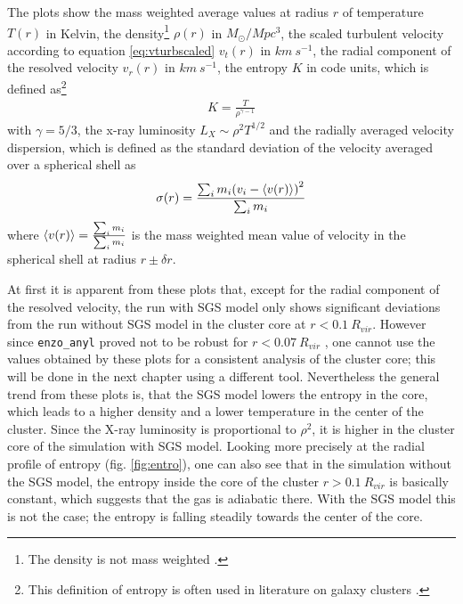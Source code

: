 The plots show the mass weighted average values at radius $r$ of temperature
$T(r)$ in Kelvin, the density\footnote{The density is not mass weighted
.} $\rho(r)$ in $\unit{M_{\odot}/Mpc^3}$, the scaled turbulent velocity
according to equation \eqref{eq:vturbscaled} $v_t(r)$ in $\unit{km\ s^{-1}}$,
the radial component of the resolved velocity $v_r(r)$ in $\unit{km\ s^{-1}}$,
the entropy $K$ in code units, which is defined as\footnote{This definition of
entropy is often used in literature on galaxy clusters
\citep{Voit2005,Iapichino2008}.}
\begin{align}
K=\frac{T}{\rho^{\gamma-1}}
\end{align}
with $\gamma = 5/3$, the x-ray luminosity $L_X \sim \rho^2 T^{1/2}$ and the
radially averaged velocity dispersion, which is defined as the standard
deviation of the velocity averaged over a spherical shell as
\begin{align}
\sigma(r) = \frac{\sum_i m_i { \left( v_i - \langle v(r) \rangle \right) }^2}{\sum_i m_i} 
\end{align}
where $\langle v(r) \rangle = \frac{\sum_i m_i}{\sum_i m_i}$ is the mass weighted mean
value of velocity in the spherical shell at radius $r \pm \delta r$. 

At first it is apparent from these plots that, except for the radial
component of the resolved velocity, the run with SGS model only shows
significant deviations from the run without SGS model in the cluster core at
$r<0.1\ R_{vir}$. However since \texttt{enzo\_anyl} proved not to be
robust for 
$r< 0.07\ R_{vir}$ \citep{Iapichino2008}, one cannot use the values
obtained by these plots for a consistent analysis of the cluster core; this
will be done in the next chapter using a different tool.
Nevertheless the general trend from these plots is, that the SGS model lowers
the entropy in the core, which leads to a higher density and a lower
temperature in the center of the cluster. Since the X-ray luminosity is
proportional to $\rho^2$, it is higher in the cluster core of the simulation
with SGS model. Looking more precisely at the radial profile of entropy
(fig. \ref{fig:entro}), one can also see that in the simulation without the SGS
model, the entropy inside the core of the cluster $r > 0.1\ R_{vir}$ is
basically constant, which suggests that the gas is adiabatic there. With the
SGS model this is not the case; the entropy is falling steadily towards the
center of the core. 

